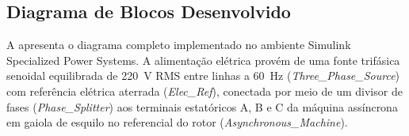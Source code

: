 \begin{table}[H]
\centering
\small
\caption{Parâmetros elétricos mapeados ($\Delta \to \text{Y}$) e constantes mecânicas no modelo Simulink SPS.}
\label{tab:parametros_Simulink}
\end{table}

\subsection{Diagrama de Blocos Desenvolvido}\label{subsec:topologia_Simulink}

A  apresenta o diagrama completo implementado no ambiente Simulink Specialized Power Systems. A alimentação elétrica provém de uma fonte trifásica senoidal equilibrada de \SI{220}{\volt} RMS entre linhas a \SI{60}{\hertz} (\textit{Three\_Phase\_Source}) com referência elétrica aterrada (\textit{Elec\_Ref}), conectada por meio de um divisor de fases (\textit{Phase\_Splitter}) aos terminais estatóricos A, B e C da máquina assíncrona em gaiola de esquilo no referencial do rotor (\textit{Asynchronous\_Machine}).

